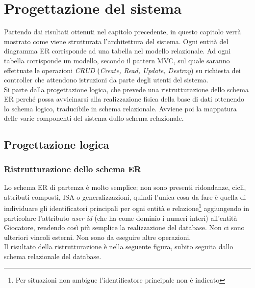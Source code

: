 \chapter{Progettazione del sistema}
Partendo dai risultati ottenuti nel capitolo precedente, in questo capitolo verrà mostrato come viene strutturata l'architettura del sistema. Ogni entità del diagramma ER corrisponde ad una tabella nel modello relazionale.\cite{DB} Ad ogni tabella corrisponde un modello, secondo il pattern MVC, sul quale saranno effettuate le operazioni \emph{CRUD} (\emph{Create, Read, Update, Destroy}) su richiesta dei controller che attendono istruzioni da parte degli utenti del sistema.\\

Si parte dalla progettazione logica, che prevede una ristrutturazione dello schema ER perché possa avvicinarsi alla realizzazione fisica della base di dati ottenendo lo schema logico, traducibile in schema relazionale. Avviene poi la mappatura delle varie componenti del sistema dullo schema relazionale.\\

\section{Progettazione logica}
\subsection{Ristrutturazione dello schema ER}
Lo schema ER di partenza è molto semplice; non sono presenti ridondanze, cicli, attributi composti, ISA o generalizzazioni, quindi l'unica cosa da fare è quella di individuare gli identificatori principali per ogni entità e relazione\footnote{Per situazioni non ambigue l'identificatore principale non è indicato} aggiungendo in particolare l'attributo \emph{user id} (che ha come dominio i numeri interi) all'entità Giocatore, rendendo così più semplice la realizzazione del database. Non ci sono ulteriori vincoli esterni. Non sono da eseguire altre operazioni.\\

Il risultato della ristrutturazione è nella seguente figura, subito seguita dallo schema relazionale del database.


